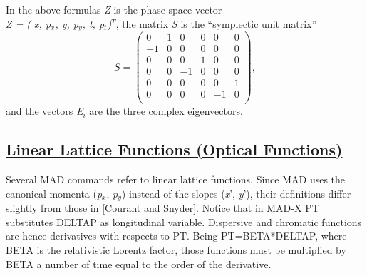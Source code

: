 In the above formulas \textit{Z} is the phase space vector \\
\textit{Z = ( x, p$_x$, y, p$_y$, t, p$_t$)$^T$},
the matrix \textit{S} is the ``symplectic unit matrix'' 
\[
S =
 \begin{pmatrix}
  0 & 1 & 0 & 0 & 0 & 0 \\
  -1 & 0 & 0 & 0 & 0 & 0 \\
  0 & 0 & 0 & 1 & 0 & 0 \\
  0 & 0 & -1 & 0 & 0 & 0 \\
  0 & 0 & 0 & 0 & 0 & 1 \\
  0 & 0 & 0 & 0 & -1 & 0 \\
 \end{pmatrix}
,
\]
and the vectors \textit{E$_i$} are the three complex eigenvectors. 

\subsection{\href{linear}{Linear Lattice Functions (Optical Functions)}} 

Several MAD commands refer to linear lattice functions. Since MAD uses
the canonical momenta (\textit{p$_x$}, \textit{p$_y$}) instead of the
slopes (\textit{x}', \textit{y}'), their definitions differ slightly
from those in \href{bibliography.html#courant}{[Courant and
    Snyder]}. Notice that in MAD-X PT substitutes DELTAP as longitudinal
variable. Dispersive and chromatic functions are hence derivatives with
respects to PT. Being PT=BETA*DELTAP, where BETA is the relativistic
Lorentz factor, those functions must be multiplied by BETA a number of
time equal to the order of the derivative. 

